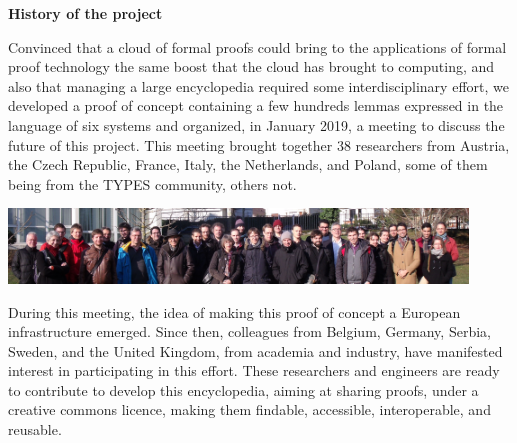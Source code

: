 \begin{framed}

\begin{center}
{\bf \Large History of the project}
\end{center}

Convinced that a cloud of formal proofs could bring to the
applications of formal proof technology the same boost that the cloud
has brought to computing, and also that managing a large encyclopedia
required some interdisciplinary effort,
we developed a proof of concept containing a few hundreds lemmas
expressed in the language of six systems and organized, in January 2019,
a meeting to discuss the future of this project.
This
meeting brought together 38 researchers from Austria, the Czech
Republic, France, Italy, the Netherlands, and Poland, some of them
being from the TYPES community, others not.
\begin{center}
\includegraphics[height=2cm]{photo.png}
\end{center}
During this meeting, the idea of making this proof of concept a European
infrastructure emerged.
Since then,
colleagues from Belgium, Germany, Serbia, Sweden, and the United
Kingdom, from academia and industry, have manifested interest in
participating in this effort.  These researchers and engineers are
ready to contribute to develop this encyclopedia, aiming at sharing
proofs, under a creative commons licence, making them findable,
accessible, interoperable, and reusable.

\end{framed}

